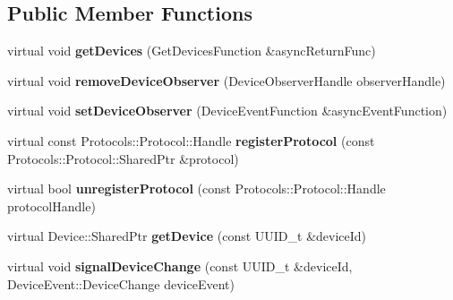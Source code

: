\subsection*{Public Member Functions}
\begin{DoxyCompactItemize}
\item 
\hypertarget{classIntel_1_1CCFL_1_1API_1_1ModelImpl_ac2741dd52f25119cbc6e3567f61bcd25}{}virtual void {\bfseries get\+Devices} (Get\+Devices\+Function \&async\+Return\+Func)\label{classIntel_1_1CCFL_1_1API_1_1ModelImpl_ac2741dd52f25119cbc6e3567f61bcd25}

\item 
\hypertarget{classIntel_1_1CCFL_1_1API_1_1ModelImpl_abf106aae363526292c0a6074ecfe5270}{}virtual void {\bfseries remove\+Device\+Observer} (Device\+Observer\+Handle observer\+Handle)\label{classIntel_1_1CCFL_1_1API_1_1ModelImpl_abf106aae363526292c0a6074ecfe5270}

\item 
\hypertarget{classIntel_1_1CCFL_1_1API_1_1ModelImpl_a91aa9a4d23b95676250ce507a1509d9b}{}virtual void {\bfseries set\+Device\+Observer} (Device\+Event\+Function \&async\+Event\+Function)\label{classIntel_1_1CCFL_1_1API_1_1ModelImpl_a91aa9a4d23b95676250ce507a1509d9b}

\item 
\hypertarget{classIntel_1_1CCFL_1_1API_1_1ModelImpl_a3dc39b19097e564441e933c8bb19290b}{}virtual const Protocols\+::\+Protocol\+::\+Handle {\bfseries register\+Protocol} (const Protocols\+::\+Protocol\+::\+Shared\+Ptr \&protocol)\label{classIntel_1_1CCFL_1_1API_1_1ModelImpl_a3dc39b19097e564441e933c8bb19290b}

\item 
\hypertarget{classIntel_1_1CCFL_1_1API_1_1ModelImpl_ae16e99e2682a4ab3ccd1296db5c27360}{}virtual bool {\bfseries unregister\+Protocol} (const Protocols\+::\+Protocol\+::\+Handle protocol\+Handle)\label{classIntel_1_1CCFL_1_1API_1_1ModelImpl_ae16e99e2682a4ab3ccd1296db5c27360}

\item 
\hypertarget{classIntel_1_1CCFL_1_1API_1_1ModelImpl_a598202ad4e608bd8c8308db922438fa0}{}virtual Device\+::\+Shared\+Ptr {\bfseries get\+Device} (const U\+U\+I\+D\+\_\+t \&device\+Id)\label{classIntel_1_1CCFL_1_1API_1_1ModelImpl_a598202ad4e608bd8c8308db922438fa0}

\item 
\hypertarget{classIntel_1_1CCFL_1_1API_1_1ModelImpl_aa8f124028e8143e132928acfced3eeaf}{}virtual void {\bfseries signal\+Device\+Change} (const U\+U\+I\+D\+\_\+t \&device\+Id, Device\+Event\+::\+Device\+Change device\+Event)\label{classIntel_1_1CCFL_1_1API_1_1ModelImpl_aa8f124028e8143e132928acfced3eeaf}

\end{DoxyCompactItemize}
